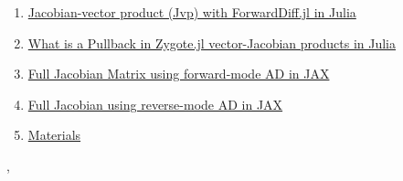 \documentclass[11pt]{article}
\renewcommand{\today}{\shortmonthname[\the\month] \the \day,  \the\year}
\begin{document}
\begin{enumerate}
	\item  \href{https://mp.weixin.qq.com/s/jMFEBU2sJe-k_USHUsRqbQ}{Jacobian-vector product (Jvp) with ForwardDiff.jl in Julia} %
	\item  \href{https://mp.weixin.qq.com/s/Bgd7OYQdDVkOGf4Syf_veQ}{What is a Pullback in Zygote.jl  vector-Jacobian products in Julia} %
	\item  \href{https://mp.weixin.qq.com/s/ZJTDVi14YLw-HiE4zRoLvg}{Full Jacobian Matrix using forward-mode AD in JAX} %
	\item  \href{https://mp.weixin.qq.com/s/BGN4wbaS9bEIS0H-7eJ-pQ}{Full Jacobian using reverse-mode AD in JAX} %
	\item \href{https://pan.baidu.com/s/1reoxKyen6z699E7lKxB5xw}{Materials} 
\end{enumerate}

%
\begin{flushright}
	\tiny \today 
\end{flushright}
\end{document}
